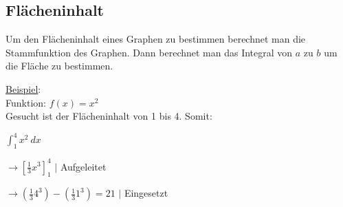 \subsection{Flächeninhalt}
Um den Flächeninhalt eines Graphen zu bestimmen berechnet man die Stammfunktion des Graphen. 
Dann berechnet man das Integral von $a$ zu $b$ um die Fläche zu bestimmen. 

\underline{Beispiel}: \\
Funktion: 
$
f(x) = x^2
$
\\
Gesucht ist der Flächeninhalt von 1 bis 4. Somit: 

$\int_1^4 x^2\ dx $

$\rightarrow [\frac{1}{3}x^3]_1^4$ $|$ Aufgeleitet

$\rightarrow (\frac{1}{3}4^3) - (\frac{1}{3}1^3) = 21$ $|$ Eingesetzt
